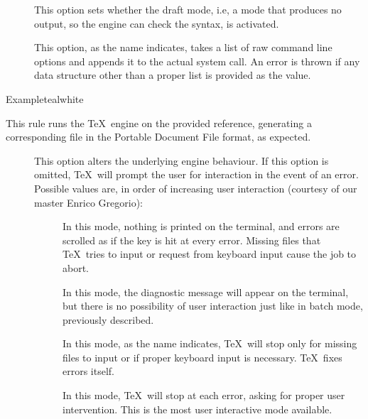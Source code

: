 \begin{description}
\begin{description}
\item[] This option sets whether the draft mode, i.e, a mode that produces no output, so the engine can check the syntax, is activated.

\item[] This option, as the name indicates, takes a list of raw command line options and appends it to the actual system call. An error is thrown if any data structure other than a proper list is provided as the value.
\end{description}

\begin{codebox}{Example}{teal}{\icnote}{white}
\end{codebox}

\item[\rulebox{pdftex}]
This rule runs the  \TeX\ engine on the provided  reference, generating a corresponding file in the Portable Document File format, as expected.

\begin{description}
\item[] This option alters the underlying engine behaviour. If this option is omitted, \TeX\ will prompt the user for interaction in the event of an error. Possible values are, in order of increasing user interaction (courtesy of our master Enrico Gregorio):

\begin{description}
\item[] In this mode, nothing is printed on the terminal, and errors are scrolled as if the  key is hit at every error. Missing files that \TeX\ tries to input or request from keyboard input cause the job to abort.

\item[] In this mode, the diagnostic message will appear on the terminal, but there is no possibility of user interaction just like in batch mode, previously described.

\item[] In this mode, as the name indicates, \TeX\ will stop only for missing files to input or if proper keyboard input is necessary. \TeX\ fixes errors itself.

\item[] In this mode, \TeX\ will stop at each error, asking for proper user intervention. This is the most user interactive mode available.
\end{description}


\end{description}
\end{description}
